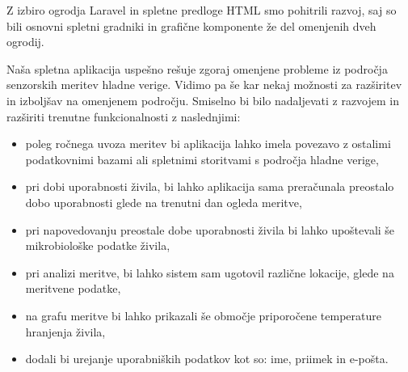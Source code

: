 \documentclass[a4paper, 12pt]{book}
\begin{document}
Z izbiro ogrodja Laravel in spletne predloge HTML smo pohitrili razvoj, saj so bili osnovni spletni gradniki in grafične komponente že del omenjenih dveh ogrodij.


Naša spletna aplikacija uspešno rešuje zgoraj omenjene probleme iz področja senzorskih meritev hladne verige. Vidimo pa še kar nekaj možnosti za razširitev in izboljšav na omenjenem področju. Smiselno bi bilo nadaljevati z razvojem in razširiti trenutne funkcionalnosti z naslednjimi:

\begin{itemize}
	\item poleg ročnega uvoza meritev bi aplikacija lahko imela povezavo z ostalimi podatkovnimi bazami ali spletnimi storitvami s področja hladne verige,

	\item pri dobi uporabnosti živila, bi lahko aplikacija sama preračunala preostalo dobo uporabnosti glede na trenutni dan ogleda meritve,

	\item pri napovedovanju preostale dobe uporabnosti živila bi lahko upoštevali še mikrobiološke podatke živila,

	\item pri analizi meritve, bi lahko sistem sam ugotovil različne lokacije, glede na meritvene podatke,

	\item na grafu meritve bi lahko prikazali še območje priporočene temperature hranjenja živila,

	\item dodali bi urejanje uporabniških podatkov kot so: ime, priimek in e-pošta.
\end{itemize}



\ \\
\clearpage
{}


\end{document}
